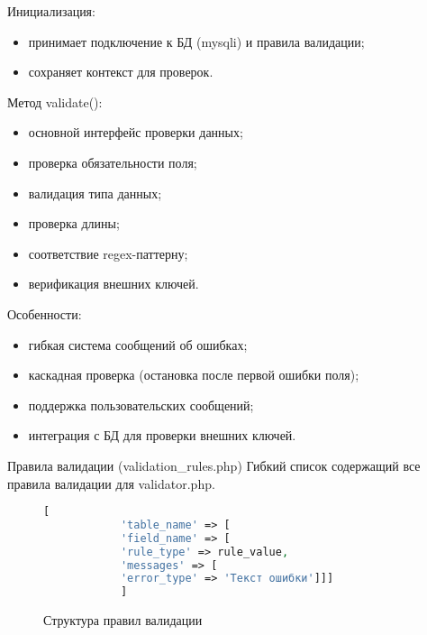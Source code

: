 Инициализация:
\begin{itemize}
	\item принимает подключение к БД (mysqli) и правила валидации;
	\item сохраняет контекст для проверок.
\end{itemize}

Метод validate():
\begin{itemize}
	\item основной интерфейс проверки данных;
	\item проверка обязательности поля;
	\item валидация типа данных;
	\item проверка длины;		
	\item соответствие regex-паттерну;
	\item верификация внешних ключей.
\end{itemize}

Особенности:
\begin{itemize}
	\item гибкая система сообщений об ошибках;
	\item каскадная проверка (остановка после первой ошибки поля);
	\item поддержка пользовательских сообщений;
	\item интеграция с БД для проверки внешних ключей.
\end{itemize}

Правила валидации (validation\_rules.php)
Гибкий список содержащий все правила валидации для validator.php.

\begin{figure}[ht]
	\begin{lstlisting}[language=Php]
			[
			'table_name' => [
			'field_name' => [
			'rule_type' => rule_value,
			'messages' => [
			'error_type' => 'Текст ошибки']]]
			]
			\end{lstlisting}
			\caption{Структура правил валидации}
			\label{fig:strcode1}
		\end{figure}
\newpage

